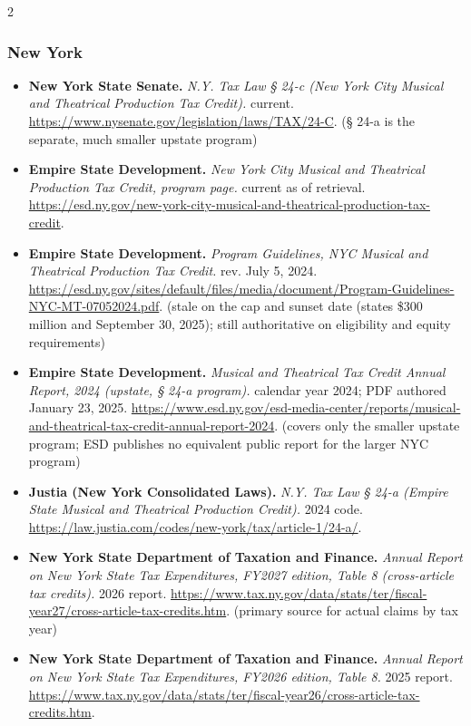 {\begin{multicols}{2}
\subsubsection*{New York}
\begin{itemize}[itemsep=0pt,topsep=1pt,parsep=0pt,partopsep=0pt,leftmargin=1em]
\item \textbf{New York State Senate.} \textit{N.Y. Tax Law § 24-c (New York City Musical and Theatrical Production Tax Credit).} current. \url{https://www.nysenate.gov/legislation/laws/TAX/24-C}. {\color{ammuted}(§ 24-a is the separate, much smaller upstate program)}
\item \textbf{Empire State Development.} \textit{New York City Musical and Theatrical Production Tax Credit, program page.} current as of retrieval. \url{https://esd.ny.gov/new-york-city-musical-and-theatrical-production-tax-credit}.
\item \textbf{Empire State Development.} \textit{Program Guidelines, NYC Musical and Theatrical Production Tax Credit.} rev. July 5, 2024. \url{https://esd.ny.gov/sites/default/files/media/document/Program-Guidelines-NYC-MT-07052024.pdf}. {\color{ammuted}(stale on the cap and sunset date (states \$300 million and September 30, 2025); still authoritative on eligibility and equity requirements)}
\item \textbf{Empire State Development.} \textit{Musical and Theatrical Tax Credit Annual Report, 2024 (upstate, § 24-a program).} calendar year 2024; PDF authored January 23, 2025. \url{https://www.esd.ny.gov/esd-media-center/reports/musical-and-theatrical-tax-credit-annual-report-2024}. {\color{ammuted}(covers only the smaller upstate program; ESD publishes no equivalent public report for the larger NYC program)}
\item \textbf{Justia (New York Consolidated Laws).} \textit{N.Y. Tax Law § 24-a (Empire State Musical and Theatrical Production Credit).} 2024 code. \url{https://law.justia.com/codes/new-york/tax/article-1/24-a/}.
\item \textbf{New York State Department of Taxation and Finance.} \textit{Annual Report on New York State Tax Expenditures, FY2027 edition, Table 8 (cross-article tax credits).} 2026 report. \url{https://www.tax.ny.gov/data/stats/ter/fiscal-year27/cross-article-tax-credits.htm}. {\color{ammuted}(primary source for actual claims by tax year)}
\item \textbf{New York State Department of Taxation and Finance.} \textit{Annual Report on New York State Tax Expenditures, FY2026 edition, Table 8.} 2025 report. \url{https://www.tax.ny.gov/data/stats/ter/fiscal-year26/cross-article-tax-credits.htm}.

\end{itemize}
\end{multicols}}
